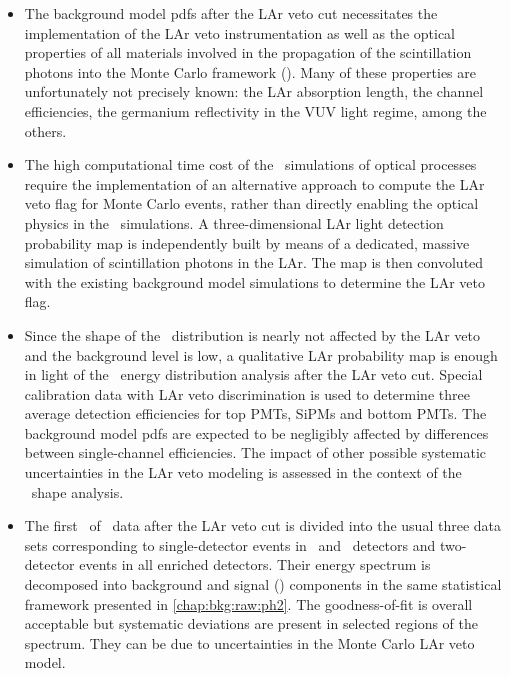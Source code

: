 \chapsummary
\begin{itemize}
  \item The background model pdfs after the LAr veto cut necessitates the implementation
    of the LAr veto instrumentation as well as the optical properties of all materials
    involved in the propagation of the scintillation photons into the Monte Carlo
    framework (\mage). Many of these properties are unfortunately not precisely known: the
    LAr absorption length, the channel efficiencies, the germanium reflectivity in the VUV
    light regime, among the others.
  \item The high computational time cost of the \geant\ simulations of optical processes
    require the implementation of an alternative approach to compute the LAr veto flag for
    Monte Carlo events, rather than directly enabling the optical physics in the \mage\
    simulations. A three-dimensional LAr light detection probability map is independently
    built by means of a dedicated, massive simulation of scintillation photons in the LAr.
    The map is then convoluted with the existing background model simulations to determine
    the LAr veto flag.
  \item Since the shape of the \nnbb\ distribution is nearly not affected by the LAr veto
    and the background level is low, a qualitative LAr probability map is enough in light
    of the \nnbb\ energy distribution analysis after the LAr veto cut. Special calibration
    data with LAr veto discrimination is used to determine three average detection
    efficiencies for top PMTs, SiPMs and bottom PMTs. The background model pdfs are
    expected to be negligibly affected by differences between single-channel efficiencies.
    The impact of other possible systematic uncertainties in the LAr veto modeling is
    assessed in the context of the \nnbb\ shape analysis.
  \item The first \gexpophasetwobkg\ of \phasetwo\ data after the LAr veto cut is divided
    into the usual three data sets corresponding to single-detector events in \bege\ and
    \scoax\ detectors and two-detector events in all enriched detectors. Their energy
    spectrum is decomposed into background and signal (\nnbb) components in the same
    statistical framework presented in \cref{chap:bkg:raw:ph2}. The goodness-of-fit is
    overall acceptable but systematic deviations are present in selected regions of the
    spectrum. They can be due to uncertainties in the Monte Carlo LAr veto model.
\end{itemize}


